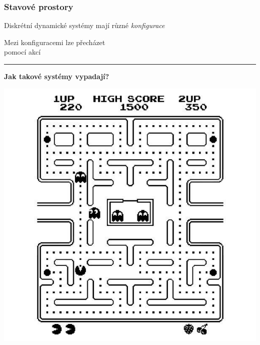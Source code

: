 \documentclass[usenames,dvipsnames,9pt]{beamer}
\begin{document}
\begin{frame}
  \frametitle{Stavové prostory}
  
   \begin{minipage}{0.5\linewidth}
   Diskrétní dynamické systémy mají různé \textit{konfigurace}
   
    \vspace{1em}
 
    Mezi konfiguracemi lze přecházet\\ pomocí akcí
    
    \vspace{4em}\hrule\vspace{2em}
 
    \hfill{\bf Jak takové systémy vypadají?}
  \end{minipage}
  \hfill
  \begin{minipage}{0.4\linewidth}
    \includegraphics[width=1.1\linewidth]{08/figs/pacman2.pdf}
  \end{minipage}
 
  

\end{frame}
\end{document}
